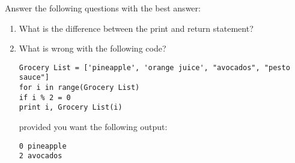\begin{problem}
Answer the following questions with the best answer:
\begin{enumerate}
\item What is the difference between the print and return statement?
\item What is wrong with the following code?
\begin{lstlisting}
Grocery List = ['pineapple', 'orange juice', "avocados", "pesto sauce"]
for i in range(Grocery List)
if i % 2 = 0
print i, Grocery List(i)
\end{lstlisting}
provided you want the following output:
\begin{lstlisting}
0 pineapple
2 avocados
\end{lstlisting}
\end{enumerate}
\end{problem}



